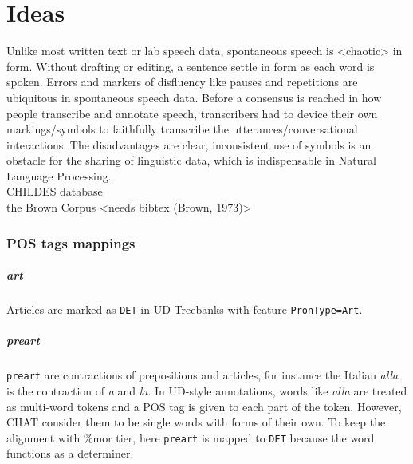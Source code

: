\chapter{Ideas} %

\label{Chapter7} %

Unlike most written text or lab speech data, spontaneous speech is <chaotic> in form. Without drafting or editing, a sentence settle in form as each word is spoken. Errors and markers of disfluency like pauses and repetitions are ubiquitous in spontaneous speech data. Before a consensus is reached in how people transcribe and annotate speech, transcribers had to device their own markings/symbols to faithfully transcribe the utterances/conversational interactions. The disadvantages are clear, inconsistent use of symbols is an obstacle for the sharing of linguistic data, which is indispensable in Natural Language Processing.\\

CHILDES database \cite{Macwhinney2000}\\
the Brown Corpus <needs bibtex (Brown, 1973)>\\

\subsection{POS tags mappings}

\paragraph{art}
Articles are marked as \texttt{DET} in UD Treebanks with feature \texttt{PronType=Art}.\\
\paragraph{preart}
\texttt{preart} are contractions of prepositions and articles, for instance the Italian \emph{alla} is the contraction of \emph{a} and \emph{la}. In UD-style annotations, words like \emph{alla} are treated as multi-word tokens and a POS tag is given to each part of the token. However, CHAT consider them to be single words with forms of their own. To keep the alignment with \%mor tier, here \texttt{preart} is mapped to \texttt{DET} because the word functions as a determiner.\\ 

